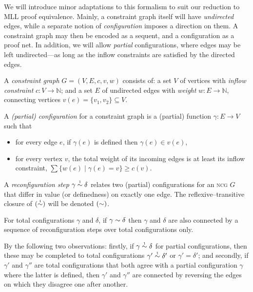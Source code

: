 \documentclass[conference]{IEEEtran}
\begin{document}
We will introduce minor adaptations to this formalism to suit our reduction to MLL proof equivalence.
%
Mainly, a constraint graph itself will have \emph{undirected} edges, while a separate notion of \emph{configuration} imposes a direction on them.
%
A constraint graph may then be encoded as a sequent, and a configuration as a proof net.
%
In addition, we will allow \emph{partial} configurations, where edges may be left undirected---as long as the inflow constraints are satisfied by the directed edges.


\begin{definition} 
A \emph{constraint graph} $G=(V,E,c,v,w)$ consists of: a set $V$ of vertices with \emph{inflow constraint} $c\colon V\to\mathbb N$; and a set $E$ of undirected edges with \emph{weight} $w\colon E\to\mathbb N$, connecting vertices $v(e)=\{v_1,v_2\}\subseteq V$.

\smallskip

A \emph{(partial) configuration} for a constraint graph is a (partial) function $\gamma\colon E\to V$ such that
\begin{itemize}
	\item
for every edge $e$, if $\gamma(e)$ is defined then $\gamma(e)\in v(e)$,
	\item
for every vertex $v$, the total weight of its incoming edges is at least its inflow constraint, 
$\sum\{w(e)\mid\gamma(e)=v\}\geq c(v)$.
\end{itemize} 

\smallskip
A \emph{reconfiguration step} $\gamma\perm*\delta$ relates two (partial) configurations for an \textsc{ncg} $G$ that differ in value (or definedness) on exactly one edge.
%
The reflexive--transitive closure of $(\perm*)$ will be denoted $(\perm)$.
%
\end{definition}


\begin{proposition}
\label{prop:partial simulates total reconfiguration}
For total configurations $\gamma$ and $\delta$, if $\gamma\perm\delta$ then $\gamma$ and $\delta$ are also connected by a sequence of reconfiguration steps over total configurations only.
\end{proposition}


\begin{IEEEproof}
By the following two observations: firstly, 
%
if $\gamma\perm*\delta$ for partial configurations, then these may be completed to total configurations $\gamma'\perm*\delta'$ or $\gamma'=\delta'$; and secondly,
%
if $\gamma'$ and $\gamma''$ are total configurations that both agree with a partial configuration $\gamma$ where the latter is defined, then $\gamma'$ and $\gamma''$ are connected by reversing the edges on which they disagree one after another.
%
\end{IEEEproof}
\end{document}
